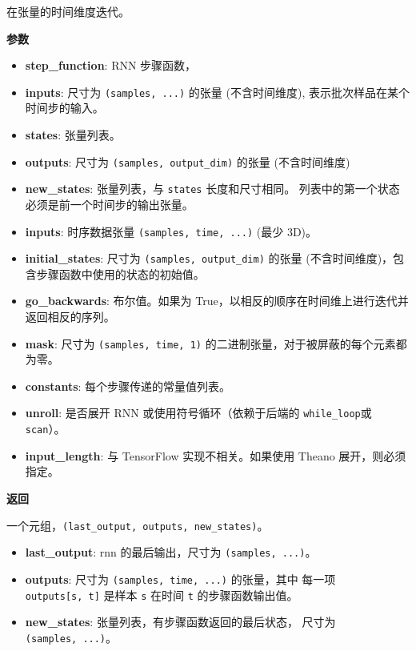在张量的时间维度迭代。

\textbf{参数}

\begin{itemize}
\tightlist
\item
  \textbf{step\_function}: RNN 步骤函数，
\item
  \textbf{inputs}: 尺寸为 \texttt{(samples,\ ...)} 的张量
  (不含时间维度), 表示批次样品在某个时间步的输入。
\item
  \textbf{states}: 张量列表。
\item
  \textbf{outputs}: 尺寸为 \texttt{(samples,\ output\_dim)} 的张量
  (不含时间维度)
\item
  \textbf{new\_states}: 张量列表，与 \texttt{states} 长度和尺寸相同。
  列表中的第一个状态必须是前一个时间步的输出张量。
\item
  \textbf{inputs}: 时序数据张量 \texttt{(samples,\ time,\ ...)} (最少
  3D)。
\item
  \textbf{initial\_states}: 尺寸为 \texttt{(samples,\ output\_dim)}
  的张量 (不含时间维度)，包含步骤函数中使用的状态的初始值。
\item
  \textbf{go\_backwards}: 布尔值。如果为
  True，以相反的顺序在时间维上进行迭代并返回相反的序列。
\item
  \textbf{mask}: 尺寸为 \texttt{(samples,\ time,\ 1)}
  的二进制张量，对于被屏蔽的每个元素都为零。
\item
  \textbf{constants}: 每个步骤传递的常量值列表。
\item
  \textbf{unroll}: 是否展开 RNN 或使用符号循环（依赖于后端的
  \texttt{while\_loop}或 \texttt{scan}）。
\item
  \textbf{input\_length}: 与 TensorFlow 实现不相关。如果使用 Theano
  展开，则必须指定。
\end{itemize}

\textbf{返回}

一个元组，\texttt{(last\_output,\ outputs,\ new\_states)}。

\begin{itemize}
\tightlist
\item
  \textbf{last\_output}: rnn 的最后输出，尺寸为
  \texttt{(samples,\ ...)}。
\item
  \textbf{outputs}: 尺寸为 \texttt{(samples,\ time,\ ...)} 的张量，其中
  每一项 \texttt{outputs{[}s,\ t{]}} 是样本 \texttt{s} 在时间 \texttt{t}
  的步骤函数输出值。
\item
  \textbf{new\_states}: 张量列表，有步骤函数返回的最后状态， 尺寸为
  \texttt{(samples,\ ...)}。
\end{itemize}

